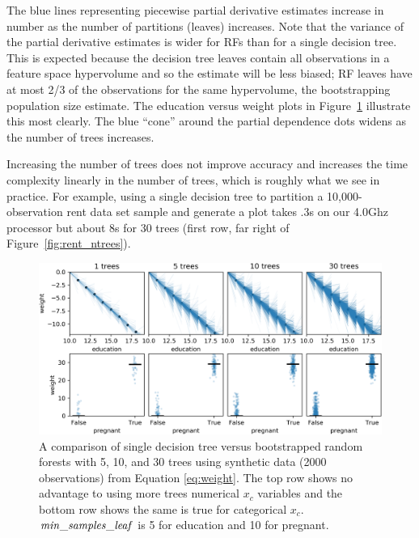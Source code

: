 \documentclass[12pt]{article}
\newcommand{\figref}[1]{Figure~\ref{#1}}
\begin{document}
The blue lines representing piecewise partial derivative estimates increase in number as the number of partitions (leaves) increases.  Note that the variance of the partial derivative estimates is wider for RFs than for a single decision tree. This is expected because the decision tree leaves contain all observations in a feature space hypervolume and so the estimate will be less biased; RF leaves have at most 2/3 of the observations for the same hypervolume, the bootstrapping population size estimate. The education versus weight plots in \figref{fig:weight_ntrees} illustrate this most clearly. The blue ``cone'' around the partial dependence dots widens as the number of trees increases.  

Increasing the number of trees does not improve accuracy and increases the time complexity linearly in the number of trees, which is roughly what we see in practice.  For example, using a single decision tree to partition a 10,000-observation rent data set sample and generate a plot takes .3s on our 4.0Ghz processor but about 8s for 30 trees (first row, far right of \figref{fig:rent_ntrees}).

\begin{figure}[htbp]
\begin{center}
\includegraphics[scale=0.55]{images/education_pregnant_vs_weight_ntrees.png}
\caption{A comparison of single decision tree versus bootstrapped random forests with 5, 10, and 30 trees using synthetic data (2000 observations) from Equation \eqref{eq:weight}. The top row shows no advantage to using more trees numerical $x_c$ variables and the bottom row shows the same is true for categorical $x_c$. ${\it min\_samples\_leaf}$ is 5 for education and 10 for pregnant.}
\label{fig:weight_ntrees}
\end{center}
\end{figure}
\end{document}
